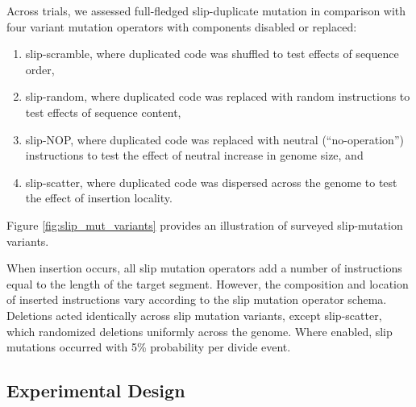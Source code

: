 Across trials, we assessed full-fledged slip-duplicate mutation in comparison with four variant mutation operators with components disabled or replaced:
\begin{enumerate}
\item slip-scramble, where duplicated code was shuffled to test effects of sequence order,
\item slip-random, where duplicated code was replaced with random instructions to test effects of sequence content,
\item slip-NOP, where duplicated code was replaced with neutral (``no-operation'') instructions to test the effect of neutral increase in genome size, and
\item slip-scatter, where duplicated code was dispersed across the genome to test the effect of insertion locality.
\end{enumerate}
Figure \ref{fig:slip_mut_variants} provides an illustration of surveyed slip-mutation variants.

When insertion occurs, all slip mutation operators add a number of instructions equal to the length of the target segment.
However, the composition and location of inserted instructions vary according to the slip mutation operator schema.
Deletions acted identically across slip mutation variants, except slip-scatter, which randomized deletions uniformly across the genome.
Where enabled, slip mutations occurred with 5\% probability per divide event.

\subsection{Experimental Design}

% 

